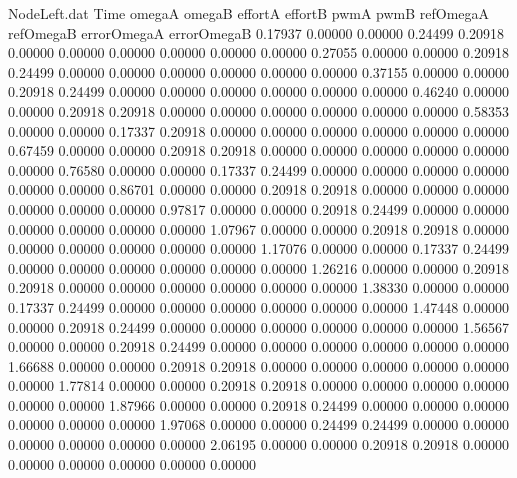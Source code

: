 \begin{filecontents}{NodeLeft.dat}
Time omegaA omegaB effortA effortB pwmA pwmB refOmegaA refOmegaB errorOmegaA errorOmegaB
   0.17937    0.00000    0.00000     0.24499    0.20918    0.00000    0.00000    0.00000    0.00000    0.00000    0.00000
   0.27055    0.00000    0.00000     0.20918    0.24499    0.00000    0.00000    0.00000    0.00000    0.00000    0.00000
   0.37155    0.00000    0.00000     0.20918    0.24499    0.00000    0.00000    0.00000    0.00000    0.00000    0.00000
   0.46240    0.00000    0.00000     0.20918    0.20918    0.00000    0.00000    0.00000    0.00000    0.00000    0.00000
   0.58353    0.00000    0.00000     0.17337    0.20918    0.00000    0.00000    0.00000    0.00000    0.00000    0.00000
   0.67459    0.00000    0.00000     0.20918    0.20918    0.00000    0.00000    0.00000    0.00000    0.00000    0.00000
   0.76580    0.00000    0.00000     0.17337    0.24499    0.00000    0.00000    0.00000    0.00000    0.00000    0.00000
   0.86701    0.00000    0.00000     0.20918    0.20918    0.00000    0.00000    0.00000    0.00000    0.00000    0.00000
   0.97817    0.00000    0.00000     0.20918    0.24499    0.00000    0.00000    0.00000    0.00000    0.00000    0.00000
   1.07967    0.00000    0.00000     0.20918    0.20918    0.00000    0.00000    0.00000    0.00000    0.00000    0.00000
   1.17076    0.00000    0.00000     0.17337    0.24499    0.00000    0.00000    0.00000    0.00000    0.00000    0.00000
   1.26216    0.00000    0.00000     0.20918    0.20918    0.00000    0.00000    0.00000    0.00000    0.00000    0.00000
   1.38330    0.00000    0.00000     0.17337    0.24499    0.00000    0.00000    0.00000    0.00000    0.00000    0.00000
   1.47448    0.00000    0.00000     0.20918    0.24499    0.00000    0.00000    0.00000    0.00000    0.00000    0.00000
   1.56567    0.00000    0.00000     0.20918    0.24499    0.00000    0.00000    0.00000    0.00000    0.00000    0.00000
   1.66688    0.00000    0.00000     0.20918    0.20918    0.00000    0.00000    0.00000    0.00000    0.00000    0.00000
   1.77814    0.00000    0.00000     0.20918    0.20918    0.00000    0.00000    0.00000    0.00000    0.00000    0.00000
   1.87966    0.00000    0.00000     0.20918    0.24499    0.00000    0.00000    0.00000    0.00000    0.00000    0.00000
   1.97068    0.00000    0.00000     0.24499    0.24499    0.00000    0.00000    0.00000    0.00000    0.00000    0.00000
   2.06195    0.00000    0.00000     0.20918    0.20918    0.00000    0.00000    0.00000    0.00000    0.00000    0.00000

\end{filecontents}
